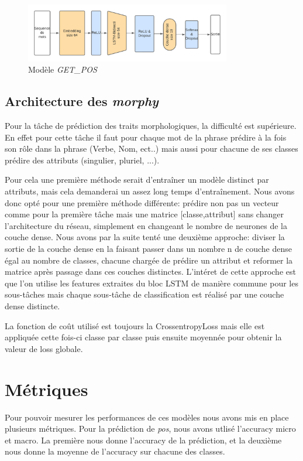 \documentclass[a4paper]{article}
\begin{document}
\begin{figure}[H]
    \centering
    \includegraphics[width=0.8\textwidth]{get_pos.png}
    \caption{Modèle \textit{GET\_POS}}
    \label{fig: model getpos}
\end{figure} 

\subsection{Architecture des \textit{morphy}}
Pour la tâche de prédiction des traits morphologiques, la difficulté est supérieure. En effet pour cette tâche 
il faut pour chaque mot de la phrase prédire à la fois son rôle dans la phrase (Verbe, Nom, ect..) mais aussi 
pour chacune de ses classes prédire des attributs (singulier, pluriel, ...).

Pour cela une première méthode serait d'entraîner un modèle distinct par attributs, mais cela demanderai un 
assez long temps d'entraînement. Nous avons donc opté pour une première méthode différente: prédire non pas un 
vecteur comme pour la première tâche mais une matrice [classe,attribut] sans changer l'architecture du réseau, 
simplement en changeant le nombre de neurones de la couche dense. Nous avons par la suite tenté une deuxième 
approche: diviser la sortie de la couche dense en la faisant passer dans un nombre n de couche dense égal au 
nombre de classes, chacune chargée de prédire un attribut et reformer la matrice après passage dans ces couches 
distinctes. L'intéret de cette approche est que l'on utilise les features extraites du bloc LSTM de manière 
commune pour les sous-tâches mais chaque sous-tâche de classification est réalisé par une couche dense distincte.

La fonction de coût utilisé est toujours la CrossentropyLoss mais elle est appliquée cette fois-ci classe par 
classe puis ensuite moyennée pour obtenir la valeur de loss globale.


\section{Métriques}

Pour pouvoir mesurer les performances de ces modèles nous avons mis en place plusieurs métriques. Pour la prédiction de 
\textit{pos}, nous avons utlisé l'accuracy micro et macro. La première nous donne l'accuracy de la prédiction, et la deuxième
nous donne la moyenne de l'accuracy sur chacune des classes. 
\end{document}
